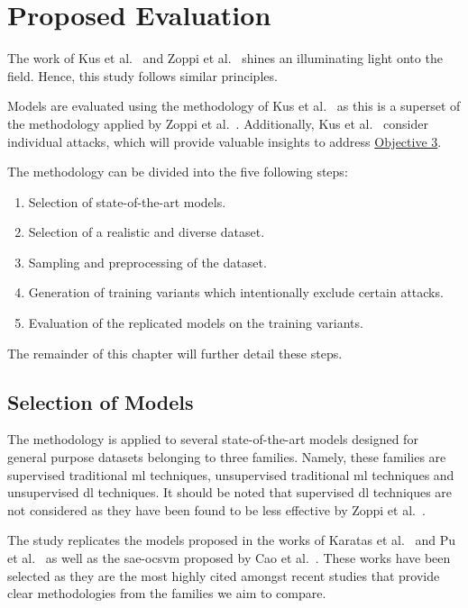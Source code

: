 \chapter{Proposed Evaluation}%
\label{chp:evaluation}

The work of Kus et al.~\cite{Kus} and Zoppi et al.~\cite{Zoppi} shines an
illuminating light onto the field. Hence, this study follows similar
principles.

Models are evaluated using the methodology of Kus et al.~\cite{Kus} as this is
a superset of the methodology applied by Zoppi et al.~\cite{Zoppi}.
Additionally, Kus et al.~\cite{Kus} consider individual attacks, which will
provide valuable insights to address \hyperlink{obj}{Objective 3}.

The methodology can be divided into the five following steps:
\begin{enumerate}
      \item Selection of state-of-the-art models.
      \item Selection of a realistic and diverse dataset.
      \item Sampling and preprocessing of the dataset.
      \item Generation of training variants which intentionally exclude certain attacks.
      \item Evaluation of the replicated models on the training variants.
\end{enumerate}
The remainder of this chapter will further detail these steps.

\section{Selection of Models}%
\label{sec:models}

The methodology is applied to several state-of-the-art models designed for
general purpose datasets belonging to three families. Namely, these families
are supervised traditional \gls{ml} techniques, unsupervised traditional
\gls{ml} techniques and unsupervised \gls{dl} techniques. It should be noted
that supervised \gls{dl} techniques are not considered as they have been found
to be less effective by Zoppi et al.~\cite{Zoppi}.

The study replicates the models proposed in the works of Karatas et
al.~\cite{Karatas} and Pu et al.~\cite{Pu} as well as the \gls{sae}-\gls{ocsvm}
proposed by Cao et al.~\cite{Cao}. These works have been selected as they are
the most highly cited amongst recent studies that provide clear methodologies
from the families we aim to compare.

